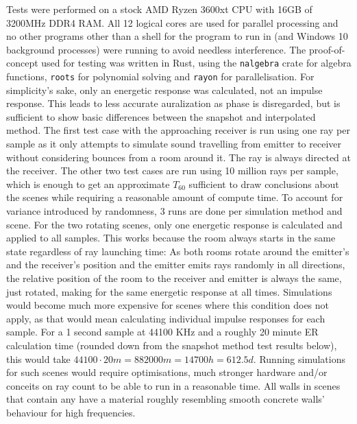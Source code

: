 Tests were performed on a stock AMD Ryzen 3600xt CPU with 16GB of 3200MHz DDR4 RAM.
All 12 logical cores are used for parallel processing
and no other programs other than a shell for the program to run in (and Windows 10 background processes) were running to avoid needless interference.
\newline
The proof-of-concept used for testing was written in Rust, using the \verb|nalgebra| crate for algebra functions,
\verb|roots| for polynomial solving and \verb|rayon| for parallelisation.
For simplicity's sake, only an energetic response was calculated, not an impulse response.
This leads to less accurate auralization as phase is disregarded,
but is sufficient to show basic differences between the snapshot and interpolated method.
\newline
The first test case with the approaching receiver is run using one ray per sample
as it only attempts to simulate sound travelling from emitter to receiver
without considering bounces from a room around it.
The ray is always directed at the receiver.
\newline
The other two test cases are run using 10 million rays per sample,
which is enough to get an approximate \(T_{60}\) sufficient to draw conclusions about the scenes
while requiring a reasonable amount of compute time.
To account for variance introduced by randomness, 3 runs are done per simulation method and scene.
\newline
For the two rotating scenes, only one energetic response is calculated and applied to all samples.
This works because the room always starts in the same state regardless of ray launching time:
As both rooms rotate around the emitter's and the receiver's position
and the emitter emits rays randomly in all directions,
the relative position of the room to the receiver and emitter is always the same, just rotated,
making for the same energetic response at all times.
\newline
Simulations would become much more expensive for scenes where this condition does not apply,
as that would mean calculating individual impulse responses for each sample.
For a 1 second sample at 44100 KHz and a roughly 20 minute ER calculation time
(rounded down from the snapshot method test results below),
this would take \(44100 \cdot 20 m = 882000 m = 14700 h = 612.5 d\).
Running simulations for such scenes would require optimisations, much stronger hardware
and/or conceits on ray count to be able to run in a reasonable time.
\newline
All walls in scenes that contain any have a material roughly resembling smooth concrete walls' behaviour for high frequencies.
